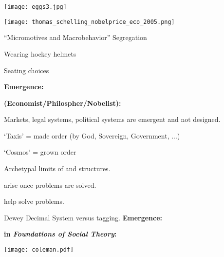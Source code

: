       
\begin{marginfigure}[]
\texttt{[image: eggs3.jpg]}\\
\end{marginfigure}

      
      \begin{center}
      
\begin{marginfigure}[]
\texttt{[image: thomas\_schelling\_nobelprice\_eco\_2005.png]}
\end{marginfigure}

        ``Micromotives and Macrobehavior''\cite{schelling1978a}
          Segregation\cite{schelling1971a,schelling2006a}
        
          Wearing hockey helmets\cite{schelling1973a}
        
          Seating choices
      \end{center}
  \textbf{Emergence:}

  \textbf{
      \smallskip
      (Economist/Philospher/Nobelist):
    }
    
     Markets, legal systems, political systems are emergent and not designed.
       
      `Taxis' = made order (by God, Sovereign, Government, ...)
    
      `Cosmos' = grown order
    
      Archetypal limits of  and  structures.
    
       arise once problems are solved.\cite{dodds2003c}
    
       help solve problems.
    
      Dewey Decimal System versus tagging.
  \textbf{Emergence:}

  \textbf{
      \smallskip
      in \textit{Foundations of Social Theory}:}
    
\begin{marginfigure}[]
\texttt{[image: coleman.pdf]}
\end{marginfigure}

  \bigskip
  
